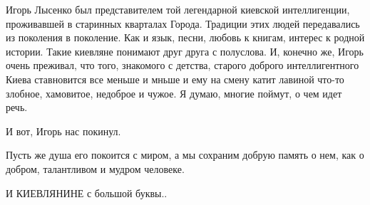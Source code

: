 Игорь Лысенко был представителем той легендарной киевской интеллигенции,
проживавшей в старинных кварталах Города. Традиции этих людей передавались из
поколения в поколение. Как и язык, песни, любовь к книгам, интерес к родной
истории. Такие киевляне понимают друг друга с полуслова. И, конечно же, Игорь
очень преживал, что того, знакомого с детства, старого доброго интеллигентного
Киева ставновится все меньше и мньше и ему на смену катит лавиной что-то
злобное, хамовитое, недоброе и чужое. Я думаю, многие поймут, о чем идет речь.

И вот, Игорь нас покинул.

Пусть же душа его покоится с миром, а мы сохраним добрую память о нем, как о
добром, талантливом и мудром человеке.

И КИЕВЛЯНИНЕ с большой буквы..
